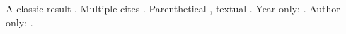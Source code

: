 \documentclass{article}
\begin{document}
A classic result \cite{shannon1948}. Multiple cites \cite{knuth1984, lamport1986}.
Parenthetical \citep{einstein1905}, textual \citet{hawking1988}.
Year only: \citeyear{turing1936}. Author only: \citeauthor{goedel1931}.


\end{document}
